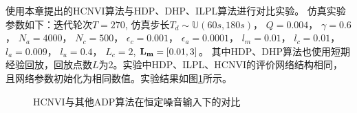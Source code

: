 使用本章提出的HCNVI算法与HDP、DHP、ILPL算法进行对比实验。
仿真实验参数如下：迭代轮次$T=270$, 仿真步长$T_d\sim \mathbb{U}(60s, 180s)$， $Q=0.004$，
$\gamma=0.6$， $N_a=4000$， $N_c=500$， $\epsilon _c=0.001$，
$\epsilon _a=0.0001$， $l_m=0.01$， $l_c=0.01$， $l_a=0.009$，
$l_u=0.4$， $L_c=2$, $\mathbf {L_m}=[0.01,3]$。
其中HDP、DHP算法也使用短期经验回放，回放点数$L$为2。实验中HDP、ILPL、HCNVI的评价网络结构相同，且网络参数初始化为相同数值。实验结果如图\ref{fig:HCNVI_HDP}所示。
\begin{figure}[htb]
\centering \subfigure{\label{fig:concentraion_out_exp1}}
{} \centering
 \subfigure{\label{fig:cost_exp1}}
{}
    \caption{HCNVI与其他ADP算法在恒定噪音输入下的对比}
  \addtocounter{figure}{-1}
  \vspace{-5pt}
  \renewcommand{\figurename}{图}
    \label{fig:HCNVI_HDP}
\end{figure}



